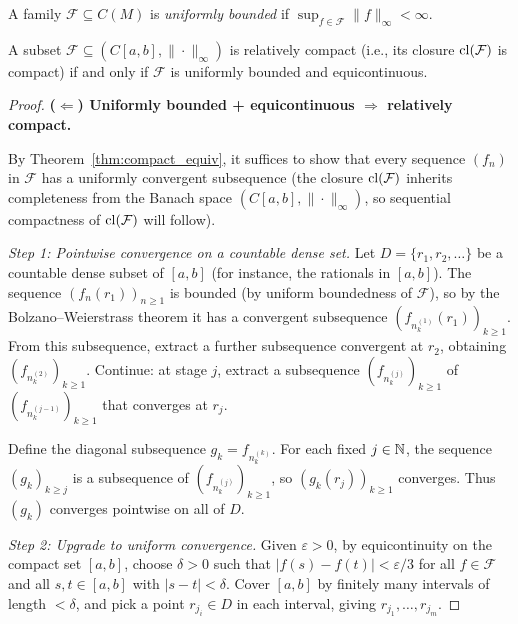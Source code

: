 \documentclass[11pt,a4paper]{article}
\begin{document}
\begin{definition}
\label{def:unif_bounded}
A family $\mathcal{F} \subseteq C(M)$ is \emph{uniformly bounded} if
$\sup_{f \in \mathcal{F}} \|f\|_\infty < \infty$.
\end{definition}

\begin{theorem}
\label{thm:arzela_ascoli}
A subset $\mathcal{F} \subseteq (C[a,b], \|\cdot\|_\infty)$ is relatively
compact (i.e., its closure $\operatorname{cl}(\mathcal{F})$ is compact) if and only if
$\mathcal{F}$ is uniformly bounded and equicontinuous.
\end{theorem}

\begin{proof}
\textbf{($\Leftarrow$) Uniformly bounded + equicontinuous $\Rightarrow$
relatively compact.}

By Theorem~\ref{thm:compact_equiv}, it suffices to show that every sequence
$(f_n)$ in $\mathcal{F}$ has a uniformly convergent subsequence (the closure
$\operatorname{cl}(\mathcal{F})$ inherits completeness from the Banach space
$(C[a,b], \|\cdot\|_\infty)$, so sequential compactness of $\operatorname{cl}(\mathcal{F})$
will follow).

\emph{Step 1: Pointwise convergence on a countable dense set.}
Let $D = \{r_1, r_2, \ldots\}$ be a countable dense subset of $[a,b]$ (for
instance, the rationals in $[a,b]$). The sequence $(f_n(r_1))_{n \ge 1}$ is
bounded (by uniform boundedness of $\mathcal{F}$), so by the
Bolzano--Weierstrass theorem it has a convergent subsequence
$(f_{n_k^{(1)}}(r_1))_{k \ge 1}$. From this subsequence, extract a further
subsequence convergent at $r_2$, obtaining $(f_{n_k^{(2)}})_{k \ge 1}$.
Continue: at stage $j$, extract a subsequence $(f_{n_k^{(j)}})_{k \ge 1}$
of $(f_{n_k^{(j-1)}})_{k \ge 1}$ that converges at $r_j$.

Define the diagonal subsequence $g_k = f_{n_k^{(k)}}$. For each fixed
$j \in \mathbb{N}$, the sequence $(g_k)_{k \ge j}$ is a subsequence of
$(f_{n_k^{(j)}})_{k \ge 1}$, so $(g_k(r_j))_{k \ge 1}$ converges. Thus
$(g_k)$ converges pointwise on all of $D$.

\emph{Step 2: Upgrade to uniform convergence.}
Given $\varepsilon > 0$, by equicontinuity on the compact set $[a,b]$,
choose $\delta > 0$ such that $|f(s) - f(t)| < \varepsilon/3$ for all
$f \in \mathcal{F}$ and all $s, t \in [a,b]$ with $|s - t| < \delta$. Cover
$[a,b]$ by finitely many intervals of length $< \delta$, and pick a point
$r_{j_i} \in D$ in each interval, giving $r_{j_1}, \ldots, r_{j_m}$.


\end{proof}
\end{document}
